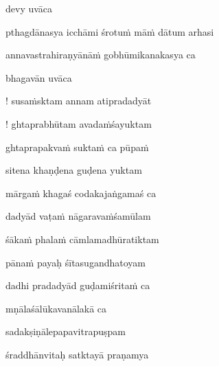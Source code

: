 \vers
\bekveg\szamveg\vfill\phpspagebreak\szam\bek{}
\thispagestyle{empty}



\jump\jump
\vers

devy uvāca~{\dandab}\dontdisplaylinenum 

pthagdānasya icchāmi śrotu\.m mā\.m dātum arhasi\thinspace{\danda} \dontdisplaylinenum

annavastrahiraṇyānā\.m gobhūmikanakasya ca \veg\dontdisplaylinenum

bhagavān uvāca~{\dandab}\dontdisplaylinenum 

\nemsloka 
! susa\.msktam annam atipradadyāt
\dontdisplaylinenum

\nemslokab 
! ghtaprabhūtam avada\.mśayuktam \danda\dontdisplaylinenum

\nemslokac 
ghtaprapakva\.m sukta\.m ca pūpa\.m
\dontdisplaylinenum

\nemslokad 
sitena khaṇḍena guḍena yuktam \veg\dontdisplaylinenum

\ujvers\nemsloka 
mārga\.m khagaś codakajaṅgamaś ca
\dontdisplaylinenum

\nemslokab 
dadyād vaṭa\.m nāgarava\.mśamūlam \danda\dontdisplaylinenum

\nemslokac 
śāka\.m phala\.m cāmlamadhūratiktam
\dontdisplaylinenum

\nemslokad 
pāna\.m payaḥ śītasugandhatoyam \veg\dontdisplaylinenum

\ujvers\nemsloka 
dadhi pradadyād guḍamiśrita\.m ca
\dontdisplaylinenum

\nemslokab 
mṇālaśālūkavanālakā ca \danda\dontdisplaylinenum

\nemslokac 
sadakṣiṇālepapavitrapuṣpam
\dontdisplaylinenum

\nemslokad 
śraddhānvitaḥ satktayā praṇamya \veg\dontdisplaylinenum

